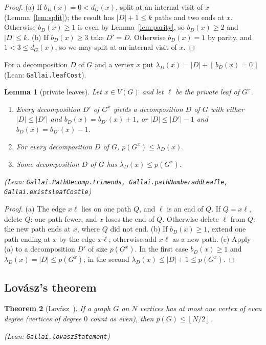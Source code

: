 \documentclass[11pt]{amsart}
\newtheorem{theorem}{Theorem}[section]
\newtheorem{lemma}[theorem]{Lemma}
\theoremstyle{definition}
\theoremstyle{remark}
\renewcommand{\_}{\oldunderscore\allowbreak}
\newcommand{\lean}[1]{\textup{(Lean: {\small\texttt{#1}})}}
\newcommand{\leanst}[1]{\par{\raggedright\small\textup{(Lean: \texttt{#1})}\par}}
\newcommand{\fl}[1]{\left\lfloor #1\right\rfloor}
\newcommand{\ind}[1]{[\,#1\,]}
\begin{document}
\begin{proof}
(a) If $b_D(x)=0<d_G(x)$, split at an internal visit of $x$ (Lemma~\ref{lem:split}); the result has
$|D|+1\le k$ paths and two ends at $x$. Otherwise $b_D(x)\ge1$ is even by Lemma~\ref{lem:parity},
so $b_D(x)\ge2$ and $|D|\le k$. (b) If $b_D(x)\ge3$ take $D'=D$. Otherwise $b_D(x)=1$ by parity, and
$1<3\le d_G(x)$, so we may split at an internal visit of $x$.
\end{proof}

For a decomposition $D$ of $G$ and a vertex $x$ put $\lambda_D(x)=|D|+\ind{b_D(x)=0}$
\lean{Gallai.leafCost}.

\begin{lemma}[private leaves]\label{lem:leaf}
Let $x\in V(G)$ and let $\ell$ be the private leaf of $G^x$.
\begin{enumerate}[label=\textup{(\alph*)}]
\item Every decomposition $D'$ of $G^x$ yields a decomposition $D$ of $G$ with either
$|D|\le|D'|$ and $b_D(x)=b_{D'}(x)+1$, or $|D|\le|D'|-1$ and $b_D(x)=b_{D'}(x)-1$.
\item For every decomposition $D$ of $G$, $p(G^x)\le\lambda_D(x)$.
\item Some decomposition $D$ of $G$ has $\lambda_D(x)\le p(G^x)$.
\end{enumerate}
\leanst{Gallai.PathDecomp.trim\_ends, Gallai.pathNumber\_addLeaf\_le, Gallai.exists\_leafCost\_le}
\end{lemma}

\begin{proof}
(a) The edge $x\ell$ lies on one path $Q$, and $\ell$ is an end of $Q$. If $Q=x\ell$, delete $Q$:
one path fewer, and $x$ loses the end of $Q$. Otherwise delete $\ell$ from $Q$: the new path ends at
$x$, where $Q$ did not end. (b) If $b_D(x)\ge1$, extend one path ending at $x$ by the edge $x\ell$;
otherwise add $x\ell$ as a new path. (c) Apply (a) to a decomposition $D'$ of size $p(G^x)$. In the
first case $b_D(x)\ge1$ and $\lambda_D(x)=|D|\le p(G^x)$; in the second
$\lambda_D(x)\le|D|+1\le p(G^x)$.
\end{proof}

\subsection{Lov\'asz's theorem}

\begin{theorem}[Lov\'asz~\cite{L68}]\label{thm:lovasz}
If a graph $G$ on $N$ vertices has at most one vertex of even degree (vertices of degree $0$ count as
even), then $p(G)\le\fl{N/2}$.
\leanst{Gallai.lovaszStatement}
\end{theorem}
\end{document}
